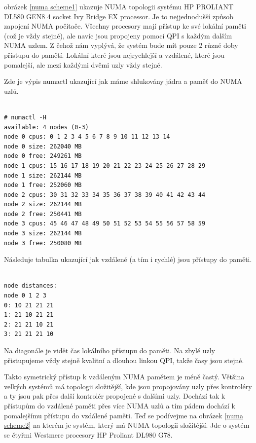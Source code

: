 \documentclass[
  master=true,
  font=sans,
  printversion=false,
  joinlists=true,
  figures=true,
  tables=true,
  sourcecodes=false,
  theorems=false,
  bibencoding=utf8,
  language=czech,
  encoding=utf8,
  field=ainfk,
  biblatex,
  glossaries,
  index
]{kidiplom}
\begin{document}
obrázek \ref{numa scheme1} ukazuje NUMA topologii systému HP PROLIANT DL580 GEN8 4 socket Ivy Bridge EX processor. Je to nejjednodušší způsob zapojení NUMA počítače. Všechny procesory mají přístup ke své lokální paměti (což je vždy stejné), ale navíc jsou propojeny pomocí QPI s každým dalším NUMA uzlem. Z čehož nám vyplývá, že systém bude mít pouze 2 různé doby přístupu do pamětí. Lokální které jsou nejrychlejší a vzdálené, které jsou pomalejší, ale mezi každými dvěmi uzly vždy stejné.

Zde je výpis numactl ukazující jak máme shlukovány jádra a paměť do NUMA uzlů.

\begin{verbatim} 

# numactl -H
available: 4 nodes (0-3)
node 0 cpus: 0 1 2 3 4 5 6 7 8 9 10 11 12 13 14
node 0 size: 262040 MB
node 0 free: 249261 MB
node 1 cpus: 15 16 17 18 19 20 21 22 23 24 25 26 27 28 29
node 1 size: 262144 MB
node 1 free: 252060 MB
node 2 cpus: 30 31 32 33 34 35 36 37 38 39 40 41 42 43 44
node 2 size: 262144 MB
node 2 free: 250441 MB
node 3 cpus: 45 46 47 48 49 50 51 52 53 54 55 56 57 58 59
node 3 size: 262144 MB
node 3 free: 250080 MB

\end{verbatim}

Následuje tabulka ukazující jak vzdálené (a tím i rychlé) jsou přístupy do paměti.

\begin{verbatim}

node distances:
node 0 1 2 3
0: 10 21 21 21
1: 21 10 21 21
2: 21 21 10 21
3: 21 21 21 10

\end{verbatim}

Na diagonále je vidět čas lokálního přístupu do paměti. Na zbylé uzly přistupujeme vždy stejně kvalitní a dlouhou linkou QPI, takže časy jsou stejné.

Takto symetrický přístup k vzdáleným NUMA pamětem je méně častý. Většina velkých systémů má topologii složitější, kde jsou propojovány uzly přes kontroléry a ty jsou pak přes další kontrolér propojené s dalšími uzly. Dochází tak k přístupům do vzdálené paměti přes více NUMA uzlů a tím pádem dochází k pomalejšímu přístupu do vzdálené paměti. Teď se podívejme na obrázek \ref{numa scheme2} na kterém je systém, který má NUMA topologii složitější. Jde o systém se čtyřmi Westmere procesory HP Proliant DL980 G78.
\end{document}
